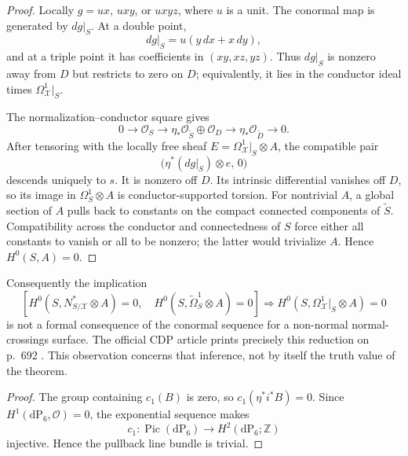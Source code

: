 \begin{proof}
Locally $g=ux$, $uxy$, or $uxyz$, where $u$ is a unit. The conormal map is
generated by $dg|_S$. At a double point,
\[
 dg|_S=u(y\,dx+x\,dy),
\]
and at a triple point it has coefficients in $(xy,xz,yz)$. Thus $dg|_S$
is nonzero away from $D$ but restricts to zero on $D$; equivalently, it
lies in the conductor ideal times $\Omega^1_{\mathcal X}|_S$.

The normalization--conductor square gives
\[
0\longrightarrow\mathcal O_S\longrightarrow
 \eta_*\mathcal O_{\widetilde S}\oplus\mathcal O_D
 \longrightarrow\eta_*\mathcal O_{\widetilde D}\longrightarrow0.
\]
After tensoring with the locally free sheaf
$E=\Omega^1_{\mathcal X}|_S\otimes A$, the compatible pair
\[
 \bigl(\eta^*(dg|_S)\otimes e,\,0\bigr)
\]
descends uniquely to $s$. It is nonzero off $D$. Its intrinsic differential
vanishes off $D$, so its image in $\Omega^1_S\otimes A$ is
conductor-supported torsion. For nontrivial $A$, a global section of $A$
pulls back to constants on the compact connected components of
$\widetilde S$. Compatibility across the conductor and connectedness of
$S$ force either all constants to vanish or all to be nonzero; the latter
would trivialize $A$. Hence $H^0(S,A)=0$.
\end{proof}

Consequently the implication
\[
\left[
 H^0(S,N^*_{S/\mathcal X}\otimes A)=0,\quad
 H^0(S,\widetilde\Omega^1_S\otimes A)=0
\right]
\Longrightarrow
H^0(S,\Omega^1_{\mathcal X}|_S\otimes A)=0
\]
is not a formal consequence of the conormal sequence for a non-normal
normal-crossings surface. The official CDP article prints precisely this
reduction on p.~692 \cite[p.~692]{CDP2020}. This observation concerns that inference, not by itself
the truth value of the theorem.


\begin{proof}
The group containing $c_1(B)$ is zero, so
$c_1(\eta^*i^*B)=0$.  Since
$H^1(\mathrm{dP}_6,\mathcal O)=0$, the exponential sequence makes
\[
 c_1:\operatorname{Pic}(\mathrm{dP}_6)
 \longrightarrow H^2(\mathrm{dP}_6;\mathbb Z)
\]
injective.  Hence the pullback line bundle is trivial.
\end{proof}

